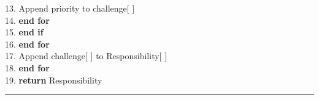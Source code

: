 13. \hspace*{2.0cm}Append priority to challenge[ ]\\
14. \hspace*{1.5cm}\textbf{end for}\\
15. \hspace*{1.0cm}\textbf{end if}\\
16. \hspace*{0.5cm}\textbf{end for}\\
17. \hspace*{0.5cm}Append challenge[ ] to Responsibility[ ]\\
18. \hspace*{0.5mm} \textbf{end for}\\
19. \textbf{return} Responsibility\\
\hrule
